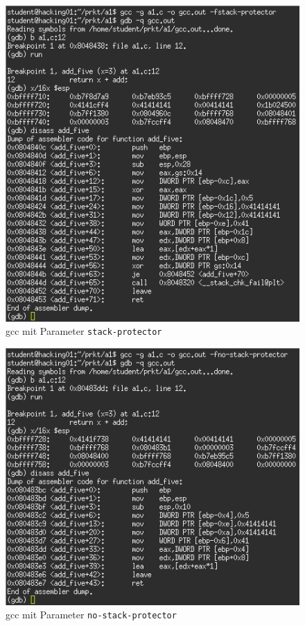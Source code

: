 \documentclass[11pt,a4paper]{article}
\begin{document}
\begin{figure}[h!]
  \caption{gcc mit Parameter \texttt{stack-protector}}
  \label{gcc0}
  \centering
    \includegraphics[scale=0.5]{1_gcc_protector_0.png}
\end{figure}
\begin{figure}[h!]
  \caption{gcc mit Parameter \texttt{no-stack-protector}}
  \label{gcc1}
  \centering
    \includegraphics[scale=0.5]{1_gcc_protector_1.png}
\end{figure}
\end{document}
